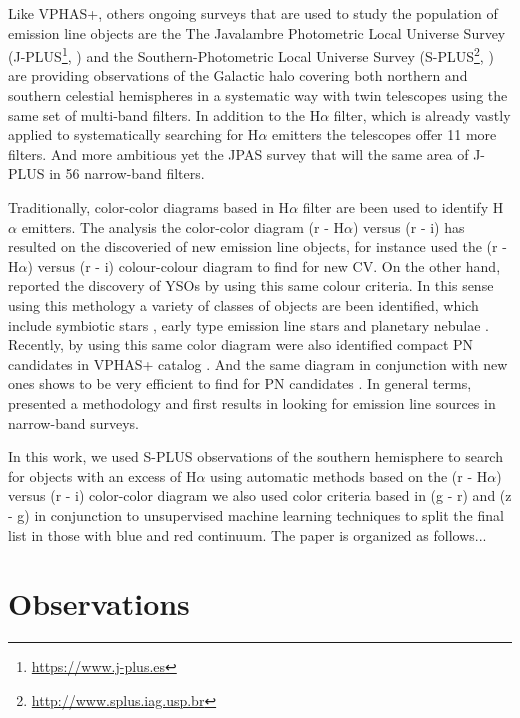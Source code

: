 \documentclass[fleqn,usenatbib]{mnras}
\begin{document}
Like VPHAS+, others ongoing surveys that are used to study the population of emission line objects are the The Javalambre Photometric Local Universe Survey (J-PLUS\footnote{\url{https://www.j-plus.es}}, \citealp{Cenarro:2018}) and the Southern-Photometric Local Universe Survey (S-PLUS\footnote{\url{http://www.splus.iag.usp.br}}, \citealp{Mendes:2019}) are providing observations of the Galactic halo covering both northern and southern celestial hemispheres in a systematic way with twin telescopes using the same set of multi-band filters. In addition to the H$\alpha$ filter, which is already vastly applied to systematically searching for H$\alpha$ emitters the telescopes offer 11 more filters. And more ambitious yet the JPAS survey that will the same area of J-PLUS in 56 narrow-band filters.

Traditionally, color-color diagrams based in H$\alpha$ filter are been used to identify H$\alpha$ emitters.  The analysis the color-color diagram  (r - H$\alpha$) versus (r - i) has resulted on the discoveried of new emission line objects, for instance \citet{Witham:2006, Witham:2007}  used the (r - H$\alpha$) versus (r - i) colour-colour diagram to find for new CV. On the other hand, \citet{Vink:2008} reported the discovery of YSOs by using this same colour criteria. In this sense using this methology a variety of classes of objects are been identified, which include symbiotic stars \citep{Corradi:2008, Corradi:2010, Corradi:2011}, early type emission line stars \citep{Drew:2008} and planetary nebulae \citep{Viirone:2009, Sabin:2010}. Recently, by using this same color diagram were also identified compact PN candidates in VPHAS+ catalog \citep{Akras:2019}. And the same diagram in conjunction with new ones shows to be very efficient to find for PN candidates \citep{Gutierrez:2020}. In general terms, \citet{Witham:2006} presented a methodology and first results in looking for emission line sources in narrow-band surveys.     

In this work, we used S-PLUS observations of the southern hemisphere to search for objects with an excess of H{$\alpha$} using automatic methods based on the (r - H$\alpha$) versus (r - i) color-color diagram we also used color criteria based in (g - r) and (z - g) in conjunction to unsupervised machine learning techniques to split the final list in those with blue and red continuum. The paper is organized as follows...

\section{Observations}
\label{sec:obser}
\end{document}
